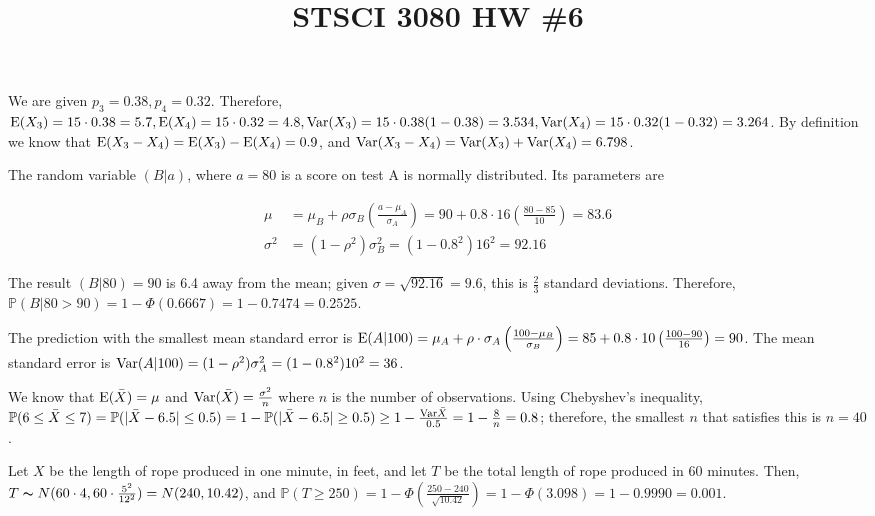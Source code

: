 

\title{STSCI 3080 HW \#6}
\author{\name}
\maketitle

We are given $p_3 = 0.38, p_4 = 0.32$. Therefore, $\mathrm{E}(X_3) = 15 \cdot 0.38 = 5.7, \mathrm{E}(X_4) = 15 \cdot 0.32 = 4.8, \mathrm{Var}(X_3) = 15 \cdot 0.38(1 - 0.38) = 3.534, \mathrm{Var}(X_4) = 15 \cdot 0.32(1 - 0.32) = 3.264$. By definition we know that $\mathrm{E}(X_3 - X_4) = \mathrm{E}(X_3) - \mathrm{E}(X_4) = 0.9$, and $\mathrm{Var}(X_3 - X_4) = \mathrm{Var}(X_3) + \mathrm{Var}(X_4) = 6.798$.

The random variable $(B|a)$, where $a = 80$ is a score on test A is normally distributed. Its parameters are

\begin{align*}
  \mu &= \mu_B + \rho \sigma_B\left(\frac{a - \mu_A}{\sigma_A}\right) = 90 + 0.8 \cdot 16\left(\frac{80 - 85}{10}\right) = 83.6 \\
  \sigma^2 &= (1 - \rho^2)\sigma_B^2 = (1 - 0.8^2)16^2 = 92.16
\end{align*}

The result $(B|80) = 90$ is 6.4 away from the mean; given $\sigma = \sqrt{92.16} = 9.6$, this is $\frac{2}{3}$ standard deviations. Therefore, $\mathbb{P}(B|80 > 90) = 1 - \Phi(0.6667) = 1 - 0.7474 = 0.2525$.

The prediction with the smallest mean standard error is $\mathrm{E}(A|100) = \mu_A + \rho \cdot \sigma_A\left(\frac{100 - \mu_B}{\sigma_B}\right) = 85 + 0.8 \cdot 10\left(\frac{100 - 90}{16}\right) = 90$. The mean standard error is $\mathrm{Var}(A|100) = (1 - \rho^2)\sigma_A^2 = (1 - 0.8^2)10^2 = 36$.

We know that $\mathrm{E}(\bar{X}) = \mu$ and $\mathrm{Var}(\bar{X}) = \frac{\sigma^2}{n}$ where $n$ is the number of observations. Using Chebyshev's inequality, $\mathbb{P}(6 \leq \bar{X} \leq 7) = \mathbb{P}(|\bar{X} - 6.5| \leq 0.5) = 1 - \mathbb{P}(|\bar{X} - 6.5| \geq 0.5) \geq 1 - \frac{\mathrm{Var}{\bar{X}}}{0.5} = 1 - \frac{8}{n} = 0.8$; therefore, the smallest $n$ that satisfies this is $n = 40$.

Let $X$ be the length of rope produced in one minute, in feet, and let $T$ be the total length of rope produced in 60 minutes. Then, $T \thicksim N(60 \cdot 4, 60 \cdot \frac{5^2}{12^2}) = N(240, 10.42)$, and $\mathbb{P}(T \geq 250) = 1 - \Phi\left(\frac{250 - 240}{\sqrt{10.42}}\right) = 1 - \Phi(3.098) = 1 - 0.9990 = 0.001$.

